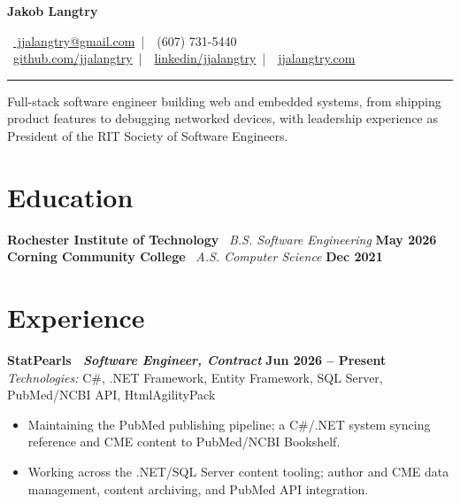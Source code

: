 \documentclass[10pt]{article}
\newcommand{\Role}[1]{{\youngserif\bfseries #1}}
\newcommand{\EntryGap}{\vspace{1.5pt}}
\newcommand{\ResumeSection}[1]{\Needspace{3\baselineskip}\section*{#1}}
\newcommand{\Meta}[1]{{\youngserif\textbar{}\ \itshape\color{Slate}#1}}
\newcommand{\Date}[1]{{\youngserif\bfseries #1}}
\newcommand{\Tech}[1]{{\itshape Technologies:} #1}
\newcommand{\Action}[1]{{\color{Accent}#1}}
\begin{document}
\fontsize{9.2}{10.3}\selectfont

\begin{minipage}[b]{0.40\linewidth}
{\youngserif\fontsize{38}{40}\selectfont\bfseries\color{Accent} Jakob Langtry}
\end{minipage}%
\hfill
\begin{minipage}[b]{0.57\linewidth}
\raggedleft
{\youngseriflight\small\color{Body}
{\color{Accent}\faEnvelope}\ \href{mailto:jjalangtry@gmail.com}{ jjalangtry@gmail.com} \,|\,
{\color{Accent}\faPhone\ (607) 731-5440} \\
{\color{Accent}\faGithub}\ \href{https://github.com/jjalangtry}{github.com/jjalangtry} \,|\,
{\color{Accent}\faLinkedinIn}\ \href{https://linkedin.com/in/jjalangtry}{linkedin/jjalangtry} \,|\,
{\color{Accent}\faGlobe}\ \href{https://jjalangtry.com}{jjalangtry.com}}
\end{minipage}
{\color{Accent}\rule{\linewidth}{0.8pt}}

\vspace{2pt}
{\youngseriflight\small\color{Slate} Full-stack software engineer building web and embedded systems, from shipping product features to debugging networked devices, with leadership experience as President of the RIT Society of Software Engineers.}
\vspace{-1pt}

\ResumeSection{Education}
{\youngserif\bfseries Rochester Institute of Technology} \Meta{B.S. Software Engineering} \hfill \Date{May 2026} \\
{\youngserif\bfseries Corning Community College} \Meta{A.S. Computer Science} \hfill \Date{Dec 2021}

\ResumeSection{Experience}
{\Role{StatPearls \Meta{Software Engineer, Contract}}} \hfill \Date{Jun 2026 -- Present} \\
\Tech{C\#, .NET Framework, Entity Framework, SQL Server, PubMed/NCBI API, HtmlAgilityPack}
\begin{itemize}
  \item Maintaining the \Action{PubMed publishing pipeline}; a C\#/.NET system syncing reference and CME content to \Action{PubMed/NCBI Bookshelf}.
  \item Working across the \Action{.NET/SQL Server} content tooling; author and CME data management, content archiving, and \Action{PubMed API integration}.
\end{itemize}
\EntryGap
\end{document}
